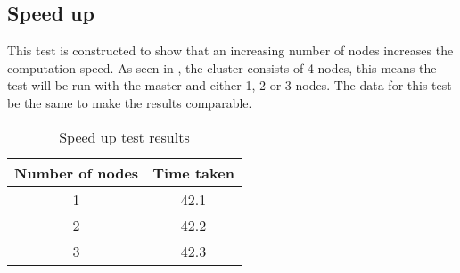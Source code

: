 \subsection{Speed up}
This test is constructed to show that an increasing number of nodes increases the computation speed. As seen in , the cluster consists of 4 nodes, this means the test will be run with the master and either 1, 2 or 3 nodes. The data for this test be the same to make the results comparable.

\begin{table}[!htb]
  \centering
  \begin{tabular}{|c|c|}
    \hline
    Number of nodes & Time taken\\
    \hline
    1 & 42.1 \\
    2 & 42.2 \\
    3 & 42.3 \\
    \hline
  \end{tabular}
  \caption{Speed up test results}\label{tab:speedup}
\end{table}

